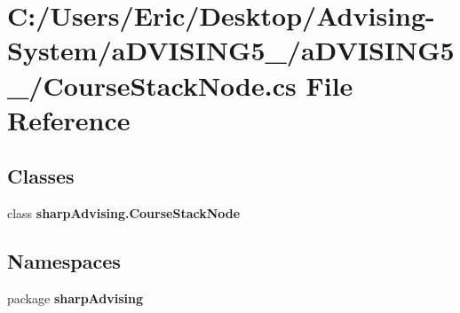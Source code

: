 \section{C\+:/\+Users/\+Eric/\+Desktop/\+Advising-\/\+System/a\+D\+V\+I\+S\+I\+N\+G5\+\_/a\+D\+V\+I\+S\+I\+N\+G5\+\_/\+Course\+Stack\+Node.cs File Reference}
\label{_course_stack_node_8cs}
\subsection*{Classes}
\begin{DoxyCompactItemize}
\item 
class {\bf sharp\+Advising.\+Course\+Stack\+Node}
\end{DoxyCompactItemize}
\subsection*{Namespaces}
\begin{DoxyCompactItemize}
\item 
package {\bf sharp\+Advising}
\end{DoxyCompactItemize}
